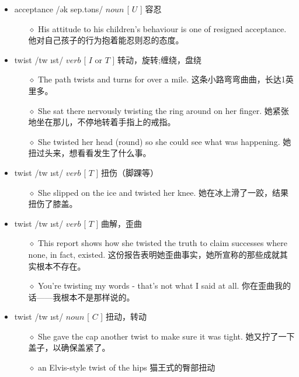 \documentclass[a4paper,top=2.5cm,buttom=2.5cm10.5pt]{book}
\begin{document}
\begin{itemize}
\item acceptance /ək \textprimstress sep.təns/ $ noun $ [  $ U $  ] 容忍
\begin{itemize}
\item[$\diamond$] His attitude to his children's behaviour is one of resigned acceptance.
他对自己孩子的行为抱着能忍则忍的态度。
\end{itemize}
\end{itemize}
\begin{itemize}
\item twist /tw \i st/ $ verb $ [  $ I $  or  $ T $  ] 转动，旋转;缠绕，盘绕
\begin{itemize}
\item[$\diamond$] The path twists and turns for over a mile.
这条小路弯弯曲曲，长达1英里多。
\item[$\diamond$] She sat there nervously twisting the ring around on her finger.
她紧张地坐在那儿，不停地转着手指上的戒指。
\item[$\diamond$] She twisted her head (round) so she could see what was happening.
她扭过头来，想看看发生了什么事。
\end{itemize}
\end{itemize}
\begin{itemize}
\item twist /tw \i st/ $ verb $ [  $ T $  ] 扭伤（脚踝等）
\begin{itemize}
\item[$\diamond$] She slipped on the ice and twisted her knee.
她在冰上滑了一跤，结果扭伤了膝盖。
\end{itemize}
\end{itemize}
\begin{itemize}
\item twist /tw \i st/ $ verb $ [  $ T $  ] 曲解，歪曲
\begin{itemize}
\item[$\diamond$] This report shows how she twisted the truth to claim successes where none, in fact, existed.
这份报告表明她歪曲事实，她所宣称的那些成就其实根本不存在。
\item[$\diamond$] You're twisting my words - that's not what I said at all.
你在歪曲我的话——我根本不是那样说的。
\end{itemize}
\end{itemize}
\begin{itemize}
\item twist /tw \i st/ $ noun $ [  $ C $  ] 扭动，转动
\begin{itemize}
\item[$\diamond$] She gave the cap another twist to make sure it was tight.
她又拧了一下盖子，以确保盖紧了。
\item[$\diamond$] an Elvis-style twist of the hips
猫王式的臀部扭动
\end{itemize}
\end{itemize}
\end{document}
